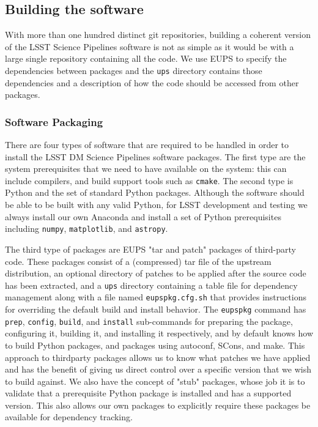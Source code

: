 \subsection{Building the software}

With more than one hundred distinct git repositories, building a coherent version of the LSST Science Pipelines software is not as simple as it would be with a large single repository containing all the code.
We use EUPS to specify the dependencies between packages and the \texttt{ups} directory contains those dependencies and a description of how the code should be accessed from other packages.

\subsubsection{Software Packaging}

There are four types of software that are required to be handled in order to install the LSST DM Science Pipelines software packages.
The first type are the system prerequisites that we need to have available on the system: this can include compilers, and build support tools such as \texttt{cmake}.
The second type is Python and the set of standard Python packages.
Although the software should be able to be built with any valid Python, for LSST development and testing we always install our own Anaconda and install a set of Python prerequisites including \texttt{numpy}, \texttt{matplotlib}, and \texttt{astropy}\cite{2018arXiv180102634T}.

The third type of packages are EUPS "tar and patch" packages of third-party code.
These packages consist of a (compressed) tar file of the upstream distribution, an optional directory of patches to be applied after the source code has been extracted, and a \texttt{ups} directory containing a table file for dependency management along with a file named \texttt{eupspkg.cfg.sh} that provides instructions for overriding the default build and install behavior.
The \texttt{eupspkg} command has \texttt{prep}, \texttt{config}, \texttt{build}, and \texttt{install} sub-commands for preparing the package, configuring it, building it, and installing it respectively, and by default knows how to build Python packages, and packages using autoconf, SCons, and make.
This approach to thirdparty packages allows us to know what patches we have applied and has the benefit of giving us direct control over a specific version that we wish to build against.
We also have the concept of "stub" packages, whose job it is to validate that a prerequisite Python package is installed and has a supported version.
This also allows our own packages to explicitly require these packages be available for dependency tracking.


